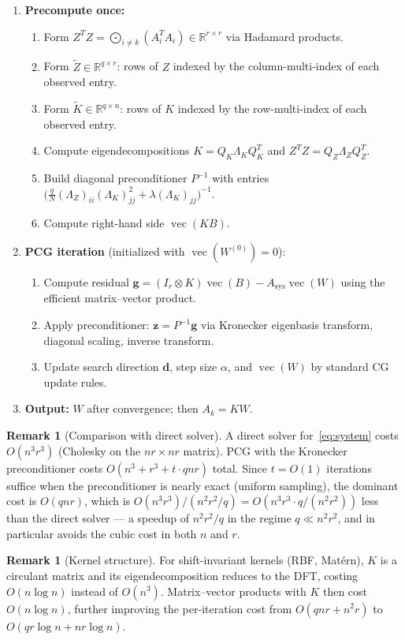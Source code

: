 \documentclass[11pt]{article}
\theoremstyle{definition}
\newtheorem{remark}[theorem]{Remark}
\DeclareMathOperator{\vecop}{vec}
\newcommand{\R}{\mathbb{R}}
\begin{document}
\begin{enumerate}
  \item \textbf{Precompute once:}
    \begin{enumerate}
      \item Form $Z^T Z = \bigodot_{i \neq k} (A_i^T A_i) \in \R^{r \times r}$ via Hadamard products.
      \item Form $\tilde{Z} \in \R^{q \times r}$: rows of $Z$ indexed by the column-multi-index of each observed entry.
      \item Form $\tilde{K} \in \R^{q \times n}$: rows of $K$ indexed by the row-multi-index of each observed entry.
      \item Compute eigendecompositions $K = Q_K \Lambda_K Q_K^T$ and $Z^T Z = Q_Z \Lambda_Z Q_Z^T$.
      \item Build diagonal preconditioner $P^{-1}$ with entries $\bigl(\frac{q}{N}(\Lambda_Z)_{ii}(\Lambda_K)_{jj}^2 + \lambda(\Lambda_K)_{jj}\bigr)^{-1}$.
      \item Compute right-hand side $\vecop(KB)$.
    \end{enumerate}
  \item \textbf{PCG iteration} (initialized with $\vecop(W^{(0)}) = 0$):
    \begin{enumerate}
      \item Compute residual $\mathbf{g} = (I_r \otimes K)\vecop(B) - A_{\mathrm{sys}}\vecop(W)$ using the efficient matrix--vector product.
      \item Apply preconditioner: $\mathbf{z} = P^{-1}\mathbf{g}$ via Kronecker eigenbasis transform, diagonal scaling, inverse transform.
      \item Update search direction $\mathbf{d}$, step size $\alpha$, and $\vecop(W)$ by standard CG update rules.
    \end{enumerate}
  \item \textbf{Output:} $W$ after convergence; then $A_k = KW$.
\end{enumerate}

\begin{remark}[Comparison with direct solver]
  A direct solver for~\eqref{eq:system} costs $O(n^3 r^3)$ (Cholesky on the $nr \times nr$ matrix). PCG with the Kronecker preconditioner costs $O(n^3 + r^3 + t \cdot qnr)$ total. Since $t = O(1)$ iterations suffice when the preconditioner is nearly exact (uniform sampling), the dominant cost is $O(qnr)$, which is $O(n^3 r^3)/(n^2 r^2/q) = O(n^3 r^3 \cdot q/(n^2 r^2))$ less than the direct solver --- a speedup of $n^2 r^2 / q$ in the regime $q \ll n^2 r^2$, and in particular avoids the cubic cost in both $n$ and $r$.
\end{remark}

\begin{remark}[Kernel structure]
  For shift-invariant kernels (RBF, Mat\'ern), $K$ is a circulant matrix and its eigendecomposition reduces to the DFT, costing $O(n \log n)$ instead of $O(n^3)$. Matrix--vector products with $K$ then cost $O(n \log n)$, further improving the per-iteration cost from $O(qnr + n^2 r)$ to $O(qr \log n + n r \log n)$.
\end{remark}
\end{document}
